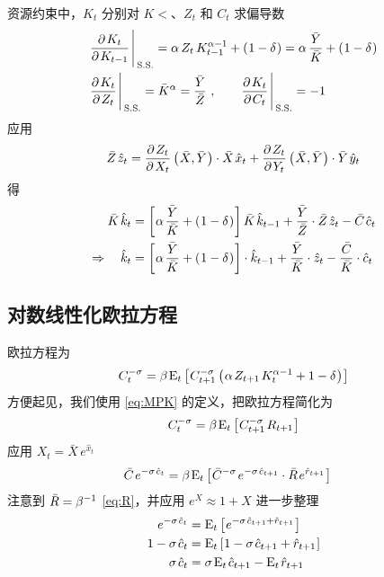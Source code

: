 
资源约束中，\(K_t\) 分别对 \(K\lt\)、\(Z_t\) 和 \(C_t\) 求偏导数
\begin{align*}
    &\dfrac{\p K_t}{\p K\lt}\Biggbar{\n{S.S.}}=\alpha\,Z_t\,K\lt^{\alpha-1}+\bka{1-\delta}=\alpha\,\dfrac{\bar Y}{\bar K}+\bka{1-\delta}\\
    &\dfrac{\p K_t}{\p Z_t}\Biggbar{\n{S.S.}}=\bar K^\alpha=\dfracb{Y}{Z} \ ,\qquad \dfrac{\p K_t}{\p C_t}\Biggbar{\n{S.S.}}=-1
\end{align*}
应用
\begin{equation*}
    \bar Z\,\hat z_t=\dfrac{\p Z_t}{\p X_t}\bka{\bar X,\bar Y}\cdot\bar X\,\hat x_t+\dfrac{\p Z_t}{\p Y_t}\bka{\bar X,\bar Y}\cdot\bar Y\,\hat y_t
\end{equation*}
得
\begin{align*}
    \bar K\,\hat k_t&=\bks{\alpha\,\dfrac{\bar Y}{\bar K}+\bka{1-\delta}}\bar K\,\hat k\lt+\dfracb{Y}{Z}\cdot\bar Z\,\hat z_t-\bar C\,\hat c_t\\
    \Rightarrow\quad \hat k_t&=\bks{\alpha\,\dfrac{\bar Y}{\bar K}+\bka{1-\delta}}\cdot\hat k\lt+\dfracb{Y}{K}\cdot\hat z_t-\dfracb{C}{K}\cdot\hat c_t
\end{align*}

\subsection{对数线性化欧拉方程}

欧拉方程为
\begin{equation*}
    C_t^{-\sigma}=\beta\,\mean_t\bks{C_{t+1}^{-\sigma}\bka{\alpha\, Z_{t+1}\,K_t^{\alpha-1}+1-\delta}}
\end{equation*}
方便起见，我们使用 \ref{eq:MPK} 的定义，把欧拉方程简化为
\begin{equation*}
    C_t^{-\sigma}=\beta\,\mean_t\bks{C_{t+1}^{-\sigma}\,R_{t+1}}
\end{equation*}
应用 \(X_t=\bar X\,e^{\hat x_t}\) 
\begin{align*}
    \bar C\,e^{-\sigma\,\hat c_t}&=\beta\,\mean_t\bks{\bar C^{-\sigma}\,e^{-\sigma\,\hat c\nt}\cdot\bar R\,e^{\hat r\nt}}
\end{align*}
注意到 \(\bar R=\beta^{-1}\) \ref{eq:R}，并应用 \(e^X\approx1+X\) 进一步整理
\begin{align}
    e^{-\sigma\,\hat c_t}&=\mean_t\bks{e^{-\sigma\,\hat c\nt+\hat r\nt}}\notag\\
    1-\sigma\,\hat c_t&=\mean_t\bks{1-\sigma\,\hat c\nt+\hat r\nt}\notag\\
    \sigma\,\hat c_t&=\sigma\,\mean_t\,\hat c\nt-\mean_t\,\hat r\nt\label{eq:LogLinEuler}
\end{align}

